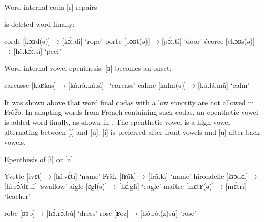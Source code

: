 \documentclass[output=paper]{langscibook}
\begin{document}
    \begin{exe}
        \ex Word-internal coda {[r]} repairs \label{ex:traore:43}
        \begin{xlist}
            \ex {[ʁ]} is deleted word-finally:\label{ex:traore:43a}
            \begin{xlist}
                \ex corde         [kɔʁd(ə)]        →         [kɔ́ː.dì]          ‘rope’
                \ex  porte           [pɔʁt(ə)]          →         [pɔ́ː.tì]     ‘door’
                \ex écorce         [ekɔʁs(ə)]        →         [hè.kɔ́ː.sì]    ‘peel’
            \end{xlist}
            \ex Word-internal vowel epenthesis: {[ʁ]} becomes an onset:\label{ex:traore:43b}
            \begin{xlist}
                \ex carcasse     [kaʁkas]         →         [kà.rà.ká.sì]~    ‘carcass’
                \ex  calme           [kalm(ə)]        →         [ká.lá.mũ̀]       ‘calm’
            \end{xlist}
        \end{xlist}
    \end{exe}


It was shown above that word final codas with a low sonority are not allowed in Fròʔò. In adapting words from French containing such codas, an epenthetic vowel is added word finally, as shown in . The epenthetic vowel is a high vowel alternating between [i] and [u]. [i] is preferred after front vowels and [u] after back vowels.


\begin{exe}
    \ex Epenthesis of [i] or [u]\label{ex:traore:44}
    \begin{xlist}
        \ex \label{ex:traore:44a}
        \begin{xlist}
        \ex Yvette             [ivɛt]              →         [hí.vɛ́tì]           ‘name’
        \ex Frãk              [fʁãk]             →         [frã́.kì]           ‘name’
        \ex hirondelle        [iʁɔdɛl]          →         [hì.rɔ̃̀.dɛ́.lì]       ‘swallow’  
        \ex aigle               [ɛgl(ə)]          →         [hɛ́.glì]           ‘eagle’
        \ex maître             [mɛtʁ(ə)]        →         [mɛ́trì]           ‘teacher’
        \end{xlist}
        \ex \label{ex:traore:44b}
        \begin{xlist}
          \ex robe               [ʁɔb]              →         [hɔ́.rɔ́.bù]       ‘dress’
          \ex rose               [ʁoz]              →         [hó.ró.(z)sù]     ‘rose’
        \end{xlist}
     \end{xlist}
\end{exe}
\end{document}
